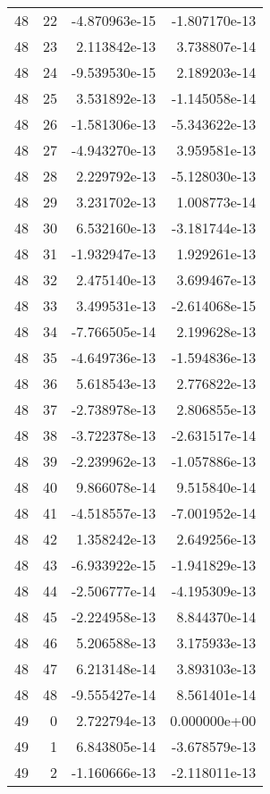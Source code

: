\begin{tabular}{rrrr}
  48 &   22 & -4.870963e-15 & -1.807170e-13 \\
  48 &   23 &  2.113842e-13 &  3.738807e-14 \\
  48 &   24 & -9.539530e-15 &  2.189203e-14 \\
  48 &   25 &  3.531892e-13 & -1.145058e-14 \\
  48 &   26 & -1.581306e-13 & -5.343622e-13 \\
  48 &   27 & -4.943270e-13 &  3.959581e-13 \\
  48 &   28 &  2.229792e-13 & -5.128030e-13 \\
  48 &   29 &  3.231702e-13 &  1.008773e-14 \\
  48 &   30 &  6.532160e-13 & -3.181744e-13 \\
  48 &   31 & -1.932947e-13 &  1.929261e-13 \\
  48 &   32 &  2.475140e-13 &  3.699467e-13 \\
  48 &   33 &  3.499531e-13 & -2.614068e-15 \\
  48 &   34 & -7.766505e-14 &  2.199628e-13 \\
  48 &   35 & -4.649736e-13 & -1.594836e-13 \\
  48 &   36 &  5.618543e-13 &  2.776822e-13 \\
  48 &   37 & -2.738978e-13 &  2.806855e-13 \\
  48 &   38 & -3.722378e-13 & -2.631517e-14 \\
  48 &   39 & -2.239962e-13 & -1.057886e-13 \\
  48 &   40 &  9.866078e-14 &  9.515840e-14 \\
  48 &   41 & -4.518557e-13 & -7.001952e-14 \\
  48 &   42 &  1.358242e-13 &  2.649256e-13 \\
  48 &   43 & -6.933922e-15 & -1.941829e-13 \\
  48 &   44 & -2.506777e-14 & -4.195309e-13 \\
  48 &   45 & -2.224958e-13 &  8.844370e-14 \\
  48 &   46 &  5.206588e-13 &  3.175933e-13 \\
  48 &   47 &  6.213148e-14 &  3.893103e-13 \\
  48 &   48 & -9.555427e-14 &  8.561401e-14 \\
  49 &    0 &  2.722794e-13 &  0.000000e+00 \\
  49 &    1 &  6.843805e-14 & -3.678579e-13 \\
  49 &    2 & -1.160666e-13 & -2.118011e-13 \\

\end{tabular}
